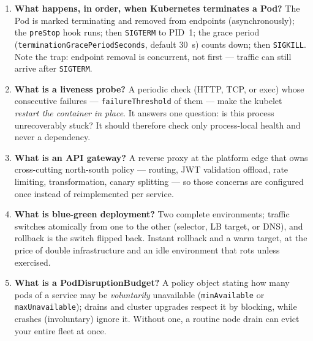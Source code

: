 \begin{enumerate}[label=\textbf{Q\arabic*.}, leftmargin=1.6cm]
        can never name anything else. Tags are for humans; digests are
        for deployments you may have to defend in an incident review.
  \item \textbf{What happens, in order, when Kubernetes terminates a
        Pod?}
        The Pod is marked terminating and removed from endpoints
        (asynchronously); the \texttt{preStop} hook runs; then
        \texttt{SIGTERM} to PID~1; the grace period
        (\texttt{terminationGracePeriodSeconds}, default 30~s) counts
        down; then \texttt{SIGKILL}. Note the trap: endpoint removal is
        concurrent, not first --- traffic can still arrive after
        \texttt{SIGTERM}.
  \item \textbf{What is a liveness probe?}
        A periodic check (HTTP, TCP, or exec) whose consecutive failures
        --- \texttt{failureThreshold} of them --- make the kubelet
        \emph{restart the container in place}. It answers one question:
        is this process unrecoverably stuck? It should therefore check
        only process-local health and never a dependency.
  \item \textbf{What is an API gateway?}
        A reverse proxy at the platform edge that owns cross-cutting
        north-south policy --- routing, JWT validation offload, rate
        limiting, transformation, canary splitting --- so those concerns
        are configured once instead of reimplemented per service.
  \item \textbf{What is blue-green deployment?}
        Two complete environments; traffic switches atomically from one
        to the other (selector, LB target, or DNS), and rollback is the
        switch flipped back. Instant rollback and a warm target, at the
        price of double infrastructure and an idle environment that rots
        unless exercised.
  \item \textbf{What is a PodDisruptionBudget?}
        A policy object stating how many pods of a service may be
        \emph{voluntarily} unavailable (\texttt{minAvailable} or
        \texttt{maxUnavailable}); drains and cluster upgrades respect it
        by blocking, while crashes (involuntary) ignore it. Without one,
        a routine node drain can evict your entire fleet at once.
\end{enumerate}

